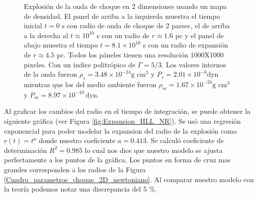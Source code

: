 \documentclass[12pt,a4paper]{book}
\begin{document}
\begin{figure}
    \caption{Explosión de la onda de choque en 2 dimensiones usando un mapa de densidad. El panel de arriba a la izquierda muestra el tiempo inicial $t=0$ s con radio de onda de choque de 2 parsec,
    el de arriba a la derecha  al $t \approx 10^{10}$ s con un radio de $r \approx 1.6$ pc y el panel de abajo muestra el tiempo $t = 8.1 \times 10^{10}$ s con un radio de expansión de $r \approx 4.5$ pc. Todos los 
    páneles tienen una resolución 1000X1000 pixeles. Con un índice politrópico de $\Gamma = 5/3$. Los valores internos de la onda fueron $\rho_{s} = 3.48 \times 10^{-24} \text{g cm}^3$ y 
    $P_{s} = 2.01 \times 10^{-6} \text{dyn}$
    mientras que los del medio ambiente fueron $\rho_{m} = 1.67 \times 10^{-24} \text{g cm}^3$ y $P_{m} = 8.97 \times 10^{-10} \, \text{dyn}$.
    \label{fig:prueba_2d_newtoniana}}
\end{figure}


Al graficar los cambios del radio en el tiempo de integración, se puede obtener la siguiente gráfica (ver Figura \ref{fig:Expansion_HLL_NR}). Se usó una regresión exponencial para poder modelar la expansion del radio 
de la explosión como $r(t) = t^a$ donde nuestro coeficiente $a = 0.413$. Se calculó coeficiente de determinación $R^2= 0.985$ lo cual nos dice que nuestro modelo se ajusta perfectamente a los puntos de la gráfica. Los
puntos en forma de cruz mas grandes corresponden a los radios de la Figura \ref{Cuadro_parametros_choque_2D_newtoniano}. Al comparar nuestro modelo con la teoría podemos notar una discrepancia del 5 \%.
\end{document}
